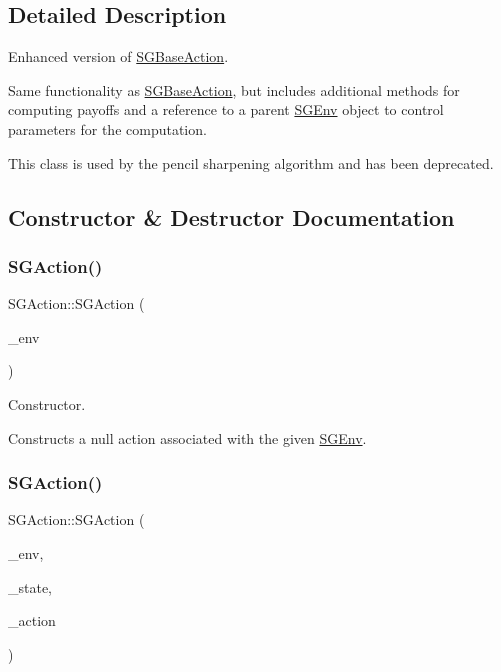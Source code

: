 \subsection{Detailed Description}
Enhanced version of \hyperlink{classSGBaseAction}{S\+G\+Base\+Action}. 

Same functionality as \hyperlink{classSGBaseAction}{S\+G\+Base\+Action}, but includes additional methods for computing payoffs and a reference to a parent \hyperlink{classSGEnv}{S\+G\+Env} object to control parameters for the computation.

This class is used by the pencil sharpening algorithm and has been deprecated. 

\subsection{Constructor \& Destructor Documentation}
\mbox{\label{classSGAction_a2beea431eab0f867e6bb678c8649c3e0}} 
\subsubsection{\texorpdfstring{S\+G\+Action()}{SGAction()}\hspace{0.1cm}{\footnotesize\ttfamily [1/2]}}
{\footnotesize\ttfamily S\+G\+Action\+::\+S\+G\+Action (\begin{DoxyParamCaption}\item[{const \hyperlink{classSGEnv}{S\+G\+Env} \&}]{\+\_\+env }\end{DoxyParamCaption})\hspace{0.3cm}{\ttfamily [inline]}}



Constructor. 

Constructs a null action associated with the given \hyperlink{classSGEnv}{S\+G\+Env}. \mbox{\label{classSGAction_a763b30d91b4ac060895b3af2731d097c}} 
\subsubsection{\texorpdfstring{S\+G\+Action()}{SGAction()}\hspace{0.1cm}{\footnotesize\ttfamily [2/2]}}
{\footnotesize\ttfamily S\+G\+Action\+::\+S\+G\+Action (\begin{DoxyParamCaption}\item[{const \hyperlink{classSGEnv}{S\+G\+Env} \&}]{\+\_\+env,  }\item[{int}]{\+\_\+state,  }\item[{int}]{\+\_\+action }\end{DoxyParamCaption})\hspace{0.3cm}{\ttfamily [inline]}}



